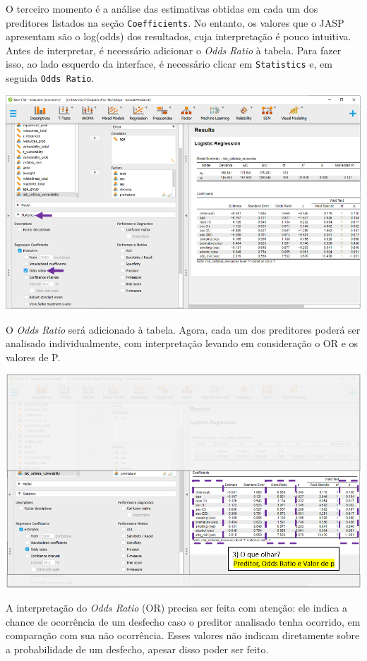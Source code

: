 \documentclass[
]{book}
\begin{document}
O terceiro momento é a análise das estimativas obtidas em cada um dos preditores listados na seção \texttt{Coefficients}. No entanto, os valores que o JASP apresentam são o log(odds) dos resultados, cuja interpretação é pouco intuitiva. Antes de interpretar, é necessário adicionar o \emph{Odds Ratio} à tabela. Para fazer isso, ao lado esquerdo da interface, é necessário clicar em \texttt{Statistics} e, em seguida \texttt{Odds\ Ratio}.

\includegraphics{./img/cap_logistica_resultado_3.png}

O \emph{Odds Ratio} será adicionado à tabela. Agora, cada um dos preditores poderá ser analisado individualmente, com interpretação levando em consideração o OR e os valores de P.

\includegraphics{./img/cap_logistica_resultado_4.png}

A interpretação do \emph{Odds Ratio} (OR) precisa ser feita com atenção: ele indica a chance de ocorrência de um desfecho caso o preditor analisado tenha ocorrido, em comparação com sua não ocorrência. Esses valores não indicam diretamente sobre a probabilidade de um desfecho, apesar disso poder ser feito.
\end{document}
